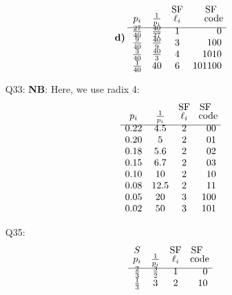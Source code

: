 \documentclass[11pt]{article}
\begin{document}
\begin{itemize}
\[        \textbf{d)}\:
        \begin{array}{cccr}
                      &               & \text{SF} & \text{SF\;\:}\\[-1mm]
           p_i        & \frac{1}{p_i} & \ell_i    &\!\text{code}\!\\[1mm]\hline\\[-5mm]
        \frac{27}{40} & \frac{40}{27} &  1        &      0\\
        \frac{9}{40} & \frac{40}{9}  &  3        &    100\\
        \frac{3}{40} & \frac{40}{3}  &  4        &   1010\\
        \frac{1}{40} &       40      &  6        & 101100\end{array}
      \]
  \item[{Q33:}] {\bf NB}: Here, we use radix 4:
       \[\begin{array}{cccr}
                      &               & \text{SF} & \text{SF\;\:}\\[-1mm]
           p_i        & \frac{1}{p_i} & \ell_i    &\!\text{code}\!\\[1mm]\hline\\[-5mm]
           0.22       &     4.5       &  2        &   00\\
           0.20       &     5         &  2        &   01\\
           0.18       &     5.6       &  2        &   02\\
           0.15       &     6.7       &  2        &   03\\
           0.10       &     10        &  2        &   10\\
           0.08       &     12.5      &  2        &   11\\
           0.05       &     20        &  3        &  100\\
           0.02       &     50        &  3        &  101\end{array}\]
  \item[{Q35:}]
       \[\begin{array}{cccr}
           S        &               & \text{SF} &  \text{SF\;\:}\\[-1mm]
           p_i      & \frac{1}{p_i} & \ell_i    &\!\text{code}\!\\[1mm]\hline\\[-5mm]
        \frac{2}{3} & \frac{3}{2}   &   1       &   0\\
        \frac{1}{3} &     3         &   2       &  10\end{array}
\]
\end{itemize}
\end{document}
